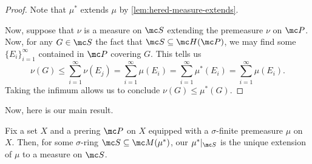 \documentclass[../notes.tex]{subfiles}
\begin{document}
\begin{proof}
	Note that $\mu^*$ extends $\mu$ by \autoref{lem:hered-measure-extends}.
	
	Now, suppose that $\nu$ is a measure on $\mc S$ extending the premeasure $\nu$ on $\mc P$. Now, for any $G\in\mc S$ the fact that $\mc S\subseteq\mc H(\mc P)$, we may find some $\{E_i\}_{i=1}^\infty$ contained in $\mc P$ covering $G$. This tells us
	\[\nu(G)\le\sum_{i=1}^\infty\nu(E_j)=\sum_{i=1}^\infty\mu(E_i)=\sum_{i=1}^\infty\mu^*(E_i)=\sum_{i=1}^\infty\mu(E_i).\]
	Taking the infimum allows us to conclude $\nu(G)\le\mu^*(G)$.
\end{proof}
Now, here is our main result.
\begin{theorem}
	Fix a set $X$ and a prering $\mc P$ on $X$ equipped with a $\sigma$-finite premeasure $\mu$ on $X$. Then, for some $\sigma$-ring $\mc S\subseteq\mc M(\mu^*)$, our $\mu^*|_{\mc S}$ is the unique extension of $\mu$ to a measure on $\mc S$.
\end{theorem}
\end{document}
